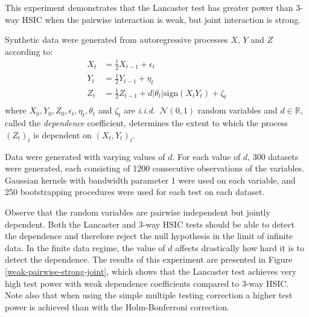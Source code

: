 \documentclass[]{article}
\begin{document}
This experiment demonstrates that the Lancaster test has greater power than 3-way HSIC when the pairwise interaction is weak, but joint interaction is strong.


Synthetic data were generated from autoregressive processes $X$, $Y$ and $Z$ according to:
\begin{align*}
X_t &= \frac{1}{2}X_{t-1} + \epsilon_t\\
Y_t &= \frac{1}{2}Y_{t-1} + \eta_t\\
Z_t &= \frac{1}{2}Z_{t-1} + d |\theta_t|\text{sign}(X_t Y_t) + \zeta_t\\
\end{align*}
where $X_0, Y_0, Z_0, \epsilon_t, \eta_t, \theta_t$ and $\zeta_t$ are \emph{i.i.d.}~$\mathcal{N}(0,1)$ random variables and $d\in\mathbb{R}$, called the \emph{dependence} coefficient, determines the extent to which the process $(Z_t)_t$ is dependent on $(X_t,Y_t)_t$.

Data were generated with varying values of $d$. For each value of $d$, 300 datasets were generated, each consisting of 1200 consecutive observations of the variables. Gaussian kernels with bandwidth parameter 1 were used on each variable, and 250 bootstrapping procedures were used for each test on each dataset.

Observe that the random variables are pairwise independent but jointly dependent. Both the Lancaster and 3-way HSIC tests should be able to detect the dependence and therefore reject the null hypothesis in the limit of infinite data. In the finite data regime, the value of $d$ affects drastically how hard it is to detect the dependence. The results of this experiment are presented in Figure \ref{weak-pairwise-strong-joint}, which shows that the Lancaster test achieves very high test power with weak dependence coefficients compared to 3-way HSIC. Note also that when using the simple multiple testing correction a higher test power is achieved than with the Holm-Bonferroni correction.
\end{document}
